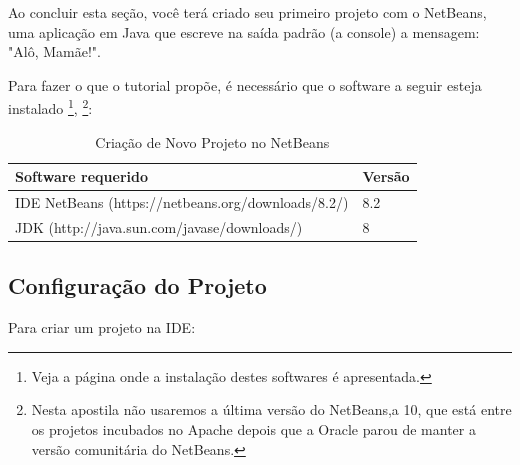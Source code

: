 \documentclass[
	12pt,				%
	twoside,			%
	a4paper,			%
	english,			%
	french,				%
	spanish,			%
	brazil				%
	]{abntex2}
\begin{document}
Ao concluir esta seção, você terá criado seu primeiro projeto com o NetBeans, uma aplicação em Java que escreve na saída padrão (a console) a mensagem: "Alô, Mamãe!".

Para fazer o que o tutorial propõe, é necessário que o software a seguir esteja instalado
\footnote{Veja a página \pageref{part:inst} onde a instalação destes softwares é apresentada.},
\footnote{Nesta apostila não usaremos a última versão do NetBeans,a 10, que está entre os projetos incubados no Apache depois que a Oracle parou de manter a versão comunitária do NetBeans.}:

\begin{table}[h]
\begin{center}
\begin{tabular}{l|l}
Software requerido & Versão\\
\hline
IDE NetBeans (https://netbeans.org/downloads/8.2/) & 8.2\\
JDK (http://java.sun.com/javase/downloads/) & 8
\end{tabular}
\end{center}
\caption{Criação de Novo Projeto no NetBeans}
\label{tab:softwares}
\end{table}

\subsection{Configuração do Projeto}

Para criar um projeto na IDE:
\end{document}
